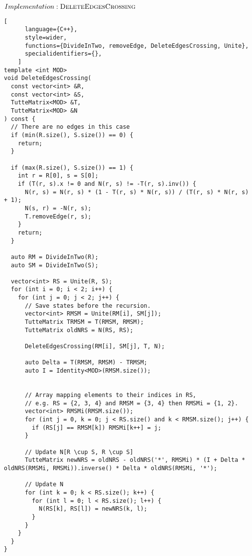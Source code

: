 \begin{programruledcaption}{\(Implementation: \textsc{DeleteEdgesCrossing}\)}
    \begin{lstlisting}[
      language={C++},
      style=wider,
      functions={DivideInTwo, removeEdge, DeleteEdgesCrossing, Unite},
      specialidentifiers={},
    ]
template <int MOD>
void DeleteEdgesCrossing(
  const vector<int> &R, 
  const vector<int> &S,
  TutteMatrix<MOD> &T,
  TutteMatrix<MOD> &N
) const {
  // There are no edges in this case
  if (min(R.size(), S.size()) == 0) {
    return;
  }

  if (max(R.size(), S.size()) == 1) {
    int r = R[0], s = S[0];
    if (T(r, s).x != 0 and N(r, s) != -T(r, s).inv()) {
      N(r, s) = N(r, s) * (1 - T(r, s) * N(r, s)) / (T(r, s) * N(r, s) + 1);
      N(s, r) = -N(r, s);
      T.removeEdge(r, s);
    }
    return;
  } 

  auto RM = DivideInTwo(R);
  auto SM = DivideInTwo(S);

  vector<int> RS = Unite(R, S);
  for (int i = 0; i < 2; i++) {
    for (int j = 0; j < 2; j++) {
      // Save states before the recursion.
      vector<int> RMSM = Unite(RM[i], SM[j]);
      TutteMatrix TRMSM = T(RMSM, RMSM);
      TutteMatrix oldNRS = N(RS, RS);

      DeleteEdgesCrossing(RM[i], SM[j], T, N);

      auto Delta = T(RMSM, RMSM) - TRMSM;
      auto I = Identity<MOD>(RMSM.size());


      // Array mapping elements to their indices in RS,
      // e.g. RS = {2, 3, 4} and RMSM = {3, 4} then RMSMi = {1, 2}.
      vector<int> RMSMi(RMSM.size());
      for (int j = 0, k = 0; j < RS.size() and k < RMSM.size(); j++) {
        if (RS[j] == RMSM[k]) RMSMi[k++] = j;
      }

      // Update N[R \cup S, R \cup S]
      TutteMatrix newNRS = oldNRS - oldNRS('*', RMSMi) * (I + Delta * oldNRS(RMSMi, RMSMi)).inverse() * Delta * oldNRS(RMSMi, '*');

      // Update N
      for (int k = 0; k < RS.size(); k++) {
        for (int l = 0; l < RS.size(); l++) {
          N(RS[k], RS[l]) = newNRS(k, l);
        }
      }
    }
  }
}
    \end{lstlisting}
\end{programruledcaption}

